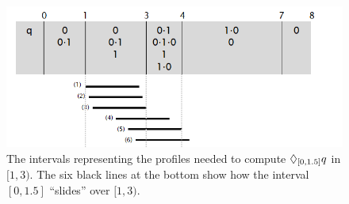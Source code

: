 \begin{figure}
	\centering
	\includegraphics[scale=0.5]{profiles.png}
	\caption{The intervals representing the profiles needed to compute $\lozenge_{[0,1.5]} q$ in $[1,3)$. The six black lines at the bottom show how the interval $[0,1.5]$ ``slides'' over $[1,3)$. \label{fig:profiles}}
\end{figure}